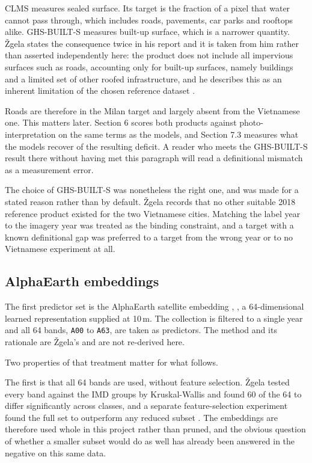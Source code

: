 \documentclass[11pt,a4paper]{article}
\begin{document}
CLMS measures sealed surface. Its target is the fraction of a pixel that water
cannot pass through, which includes roads, pavements, car parks and rooftops
alike. GHS-BUILT-S measures built-up surface, which is a narrower quantity.
Žgela states the consequence twice in his report and it is taken from him rather
than asserted independently here: the product does not include all impervious
surfaces such as roads, accounting only for built-up surfaces, namely buildings
and a limited set of other roofed infrastructure, and he describes this as an
inherent limitation of the chosen reference dataset \cite[pp.~8, 10]{zgela2026}.

Roads are therefore in the Milan target and largely absent from the Vietnamese
one. This matters later. Section 6 scores both products against
photo-interpretation on the same terms as the models, and Section 7.3 measures
what the models recover of the resulting deficit. A reader who meets the
GHS-BUILT-S result there without having met this paragraph will read a
definitional mismatch as a measurement error.

The choice of GHS-BUILT-S was nonetheless the right one, and was made for a
stated reason rather than by default. Žgela records that no other suitable 2018
reference product existed for the two Vietnamese cities. Matching the label year
to the imagery year was treated as the binding constraint, and a target with a
known definitional gap was preferred to a target from the wrong year or to no
Vietnamese experiment at all.

\subsection{AlphaEarth embeddings}

The first predictor set is the AlphaEarth satellite embedding \cite{brown2025alphaearth},
, a 64-dimensional learned representation
supplied at 10\,m. The collection is filtered to a single year and all 64 bands,
\texttt{A00} to \texttt{A63}, are taken as predictors. The method and its rationale are
Žgela's \cite[pp.~3--5]{zgela2026} and are not re-derived here.

Two properties of that treatment matter for what follows.

The first is that all 64 bands are used, without feature selection. Žgela tested
every band against the IMD groups by Kruskal-Wallis \cite{kruskal1952} and found 60 of the 64 to
differ significantly across classes, and a separate feature-selection experiment
found the full set to outperform any reduced subset \cite[pp.~3--5, Fig.~3]{zgela2026}. The
embeddings are therefore used whole in this project rather than pruned, and the
obvious question of whether a smaller subset would do as well has already been
answered in the negative on this same data.
\end{document}

